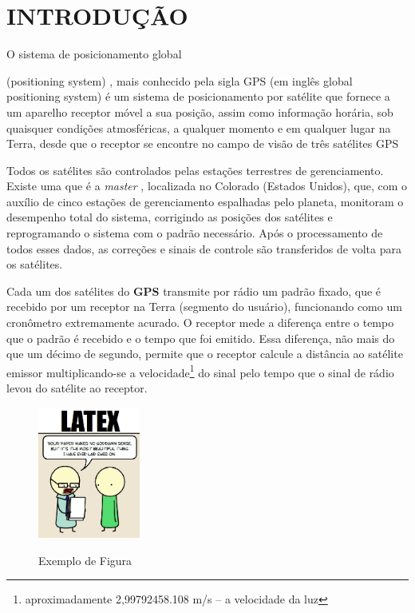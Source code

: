 
\chapter{INTRODUÇÃO}
\begin{large}
O sistema de posicionamento global
\end{large}
\foreignlanguage{english}{(positioning system)} %
, mais conhecido pela sigla GPS (em inglês global positioning system) %
é um sistema de posicionamento por satélite que fornece a um aparelho receptor móvel a sua posição, assim como informação horária,
sob quaisquer condições atmosféricas, a qualquer momento e em qualquer lugar na Terra, desde que
o receptor se encontre no campo de visão de três satélites GPS

Todos os satélites são controlados pelas estações terrestres de
gerenciamento. Existe uma que é a \textit{master} %
, localizada no Colorado (Estados Unidos), que, com o auxílio de cinco estações de gerenciamento
espalhadas pelo planeta, monitoram o desempenho total do sistema, corrigindo
as posições dos satélites e reprogramando o sistema com o padrão
necessário. Após o processamento de todos esses dados, as correções e
sinais de controle são transferidos de volta para os satélites.

Cada um dos satélites do \textbf{GPS} %
transmite por rádio um padrão fixado,
que é recebido por um receptor na Terra (segmento do usuário), funcionando
como um cronômetro extremamente acurado. O receptor mede a diferença
entre o tempo que o padrão é recebido e o tempo que foi emitido. Essa
diferença, não mais do que um décimo de segundo, permite que o receptor
calcule a distância ao satélite emissor multiplicando-se a 
velocidade\footnote{aproximadamente 2,99792458.108 m/s – a velocidade da luz} do sinal %
pelo tempo que o sinal de rádio levou do satélite ao receptor.

\begin{figure}[!htb]
    \centering
    \caption{Exemplo de Figura}
    \includegraphics[width=0.3\textwidth]{ltx_paper}
    \label{fig:figura-exemplo1}
\end{figure}

